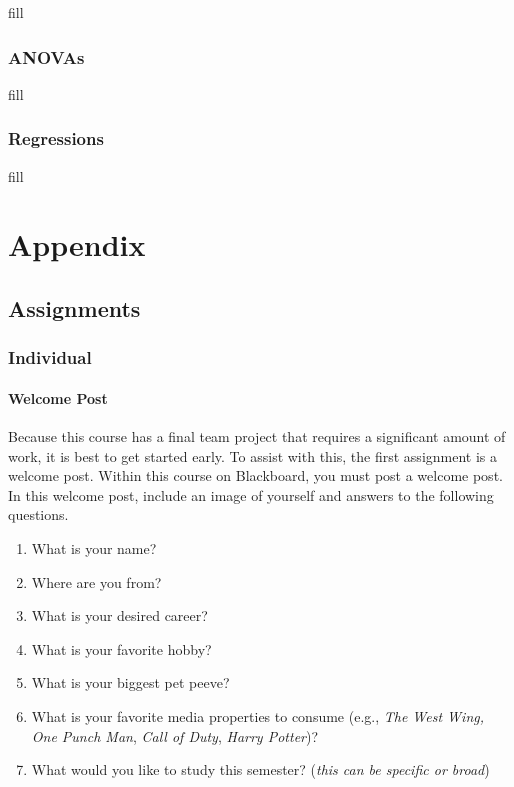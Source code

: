 \documentclass[
  b5paper]{book}
\providecommand{\tightlist}{%
  \setlength{\itemsep}{0pt}\setlength{\parskip}{0pt}}
\begin{document}
fill

\hypertarget{anovas}{%
\subsection*{ANOVAs}\label{anovas}}

fill

\hypertarget{regressions}{%
\subsection*{Regressions}\label{regressions}}

fill

\hypertarget{appendix}{%
\chapter{Appendix}\label{appendix}}

\hypertarget{assignments}{%
\section{Assignments}\label{assignments}}

\hypertarget{individual}{%
\subsection*{Individual}\label{individual}}

\hypertarget{welcome-post}{%
\subsubsection*{Welcome Post}\label{welcome-post}}

Because this course has a final team project that requires a significant amount of work, it is best to get started early. To assist with this, the first assignment is a welcome post. Within this course on Blackboard, you must post a welcome post. In this welcome post, include an image of yourself and answers to the following questions.

\begin{enumerate}
\def\labelenumi{\arabic{enumi}.}
\tightlist
\item
  What is your name?
\item
  Where are you from?
\item
  What is your desired career?
\item
  What is your favorite hobby?
\item
  What is your biggest pet peeve?
\item
  What is your favorite media properties to consume (e.g., \emph{The West Wing,} \emph{One Punch Man}, \emph{Call of Duty}, \emph{Harry Potter})?
\item
  What would you like to study this semester? (\emph{this can be specific or broad})
\end{enumerate}
\end{document}
